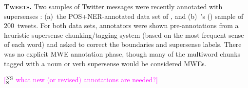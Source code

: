 \documentclass[11pt]{article}
\newcommand{\citeposs}[1]{\citeauthor{#1}'s (\citeyear{#1})}
\newcommand{\ensuretext}[1]{#1}
\newcommand{\nssmarker}{\ensuretext{\textcolor{magenta}{\ensuremath{^{\textsc{NS}}_{\textsc{S}}}}}}
\newcommand{\arkcomment}[3]{\ensuretext{\textcolor{#3}{[#1 #2]}}}
\newcommand{\nss}[1]{\arkcomment{\nssmarker}{#1}{magenta}}
\begin{document}
\textbf{\textsc{Tweets}.} Two samples of Twitter messages were recently annotated with supersenses \citep{johannsen-14}: 
(a)~the POS+NER-annotated data set of \citet{Ritter:ea:11}, 
and %
(b)~\citeposs{Plank:ea:14} sample of 200~tweets.
For both data sets, annotators were shown pre-annotations from a heuristic supersense chunking\slash tagging system 
(based on the most frequent sense of each word)
and asked to correct the boundaries and supersense labels. 
There was no explicit MWE annotation phase, 
though many of the multiword chunks tagged with a noun or verb supersense would be considered MWEs. 


\nss{what new (or revised) annotations are needed?} 
\end{document}
